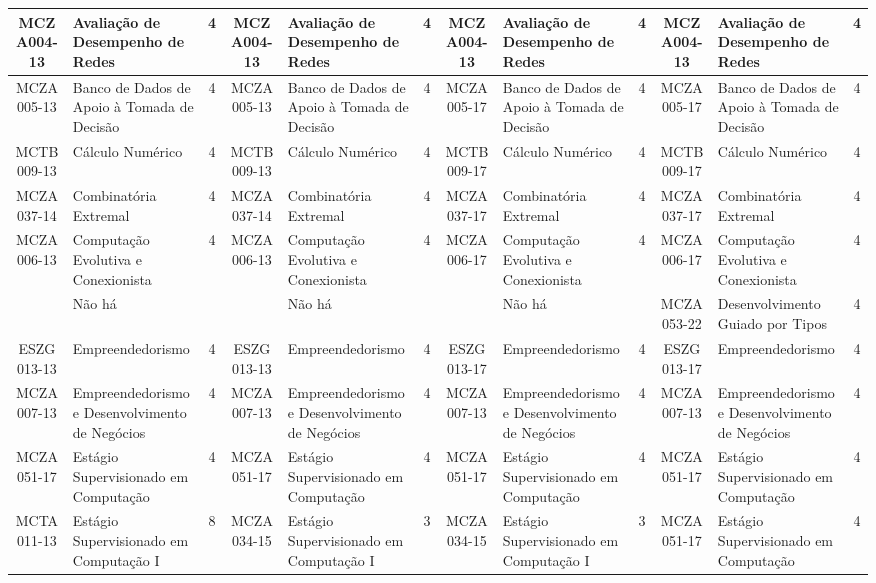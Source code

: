 \documentclass[a4paper]{article}
\begin{document}
\begin{landscape}
{\begin{longtable}{|c|p{.2\textheight}|c||c|p{.2\textheight}|c||c|p{.2\textheight}|c||c|p{.2\textheight}|c|}
MCZA004-13 & Avaliação de Desempenho de Redes & 4 &
MCZA004-13 & Avaliação de Desempenho de Redes & 4 &
MCZA004-13 & Avaliação de Desempenho de Redes & 4 &
MCZA004-13 & Avaliação de Desempenho de Redes & 4\\ \hline

MCZA005-13 & Banco de Dados de Apoio à Tomada de Decisão & 4 &
MCZA005-13 & Banco de Dados de Apoio à Tomada de Decisão & 4 &
MCZA005-17 & Banco de Dados de Apoio à Tomada de Decisão & 4 &
MCZA005-17 & Banco de Dados de Apoio à Tomada de Decisão & 4\\ \hline

MCTB009-13 & Cálculo Numérico & 4 &
MCTB009-13 & Cálculo Numérico & 4 &
MCTB009-17 & Cálculo Numérico & 4 &
MCTB009-17 & Cálculo Numérico & 4\\ \hline

MCZA037-14 & Combinatória Extremal & 4 &
MCZA037-14 & Combinatória Extremal & 4 &
MCZA037-17 & Combinatória Extremal & 4 &
MCZA037-17 & Combinatória Extremal & 4\\ \hline

MCZA006-13 & Computação Evolutiva e Conexionista & 4 &
MCZA006-13 & Computação Evolutiva e Conexionista & 4 &
MCZA006-17 & Computação Evolutiva e Conexionista & 4 &
MCZA006-17 & Computação Evolutiva e Conexionista & 4\\ \hline

& Não há & &
& Não há & & 
& Não há & & 
MCZA053-22 & Desenvolvimento Guiado por Tipos & 4\\ \hline

ESZG013-13 & Empreendedorismo & 4 &
ESZG013-13 & Empreendedorismo & 4 &
ESZG013-17 & Empreendedorismo & 4 &
ESZG013-17 & Empreendedorismo & 4\\ \hline

MCZA007-13 & Empreendedorismo e Desenvolvimento de Negócios & 4 &
MCZA007-13 & Empreendedorismo e Desenvolvimento de Negócios & 4 &
MCZA007-13 & Empreendedorismo e Desenvolvimento de Negócios & 4 &
MCZA007-13 & Empreendedorismo e Desenvolvimento de Negócios & 4\\ \hline

MCZA051-17 & Estágio Supervisionado em Computação & 4 &
MCZA051-17 & Estágio Supervisionado em Computação & 4 &
MCZA051-17 & Estágio Supervisionado em Computação & 4 &
MCZA051-17 & Estágio Supervisionado em Computação & 4\\ \hline

MCTA011-13 & Estágio Supervisionado em Computação I& 8 &
MCZA034-15 & Estágio Supervisionado em Computação I & 3 &
MCZA034-15 & Estágio Supervisionado em Computação I & 3 &
MCZA051-17 & Estágio Supervisionado em Computação & 4\\ \hline


\end{longtable}}
\end{landscape}
\end{document}
